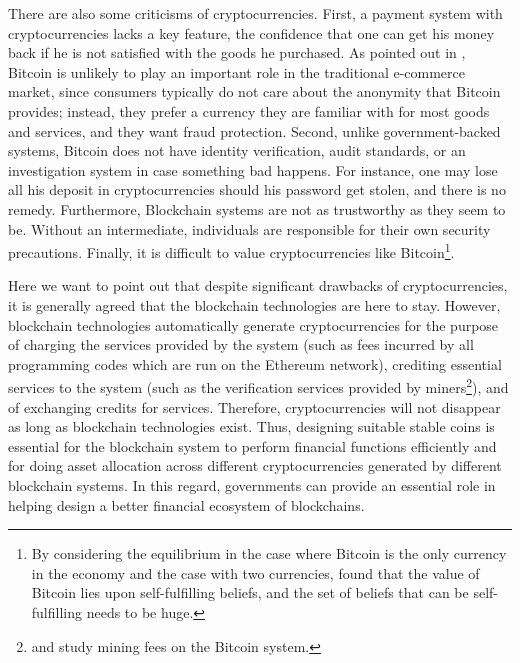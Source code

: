 \documentclass[11pt]{article}%
\numberwithin{equation}{section}
\theoremstyle{plain}
\begin{document}
There are also some criticisms of cryptocurrencies. First, a payment system with cryptocurrencies lacks a key feature, the confidence that one can get his money back if he is not satisfied with the goods he purchased. As pointed out in \cite{grinberg_bitcoin:_2011}, Bitcoin is unlikely to play an important role in the traditional e-commerce market, since consumers typically do not care about the anonymity that Bitcoin provides; instead, they prefer a currency they are familiar with for most goods and services, and they want fraud protection.  Second, unlike government-backed systems, Bitcoin does not have identity verification, audit standards, or an investigation system in case something bad happens. For instance, one may lose all his deposit in cryptocurrencies should his password get stolen, and there is no remedy. Furthermore, Blockchain systems are not as trustworthy as they seem to be. Without an intermediate, individuals are responsible for their own security precautions. Finally, it is difficult to value cryptocurrencies like Bitcoin\footnote{By considering the equilibrium in the case where Bitcoin is the only currency in the economy and the case with two currencies, \cite{garratt_bitcoin_2018} found that the value of Bitcoin lies upon self-fulfilling beliefs, and the set of beliefs that can be self-fulfilling needs to be huge.}.

Here we want to point out that despite significant drawbacks of cryptocurrencies, it is generally agreed that the blockchain technologies are here to stay. However, blockchain technologies automatically generate cryptocurrencies for the purpose of charging the services provided by the system (such as fees incurred by all programming codes which are run on the Ethereum network), crediting essential services to the system (such as the verification services provided by miners\footnote{\cite{ehb2017} and \cite{hlm2017} study mining fees on the Bitcoin system.}), and of exchanging credits for services. Therefore, cryptocurrencies will not disappear as long as blockchain technologies exist. Thus, designing suitable stable coins is essential for the blockchain system to perform financial functions efficiently and for doing asset allocation across different cryptocurrencies generated by different blockchain systems. In this regard, governments can provide an essential role in helping design a better financial ecosystem of blockchains.

\end{document}

